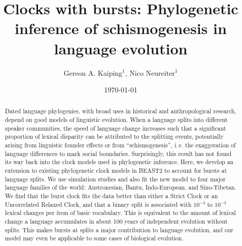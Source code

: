 \documentclass[]{rsos}%
\begin{document}
\title{Clocks with bursts: Phylogenetic inference of schismogenesis in language evolution}
\date{\today}
\author{
  Gereon A. Kaiping$^{1}$,
  Nico Neureiter$^{1}$}
\address{$^{1}$Geographic Information Science Center, Universität Zürich, CH}
\subject{Linguistics, Bioinformatics}


\begin{abstract}
Dated language phylogenies, with broad uses in historical and anthropological
research, depend on good models of linguistic evolution.
When a language splits into different speaker communities, the speed of
language change increases such that a
significant proportion of lexical disparity can be attributed
to the splitting events, potentially arising from linguistic founder effects or from
“schis\-mo\-gen\-e\-sis”, i.\,e.
the exaggeration of language differences to mark social boundaries.
Surprisingly, this result has not found its way back
into the clock models used in phylogenetic inference. Here, we develop an
extension to existing phylogenetic clock models in BEAST2 to
account for bursts at language splits. We use simulation studies and also fit
the new model to four major language families of the world: Austronesian,
Bantu, Indo-European, and Sino-Tibetan. We find that the burst clock fits the
data better than either a Strict Clock or an Uncorrelated Relaxed Clock, and that
a binary split is associated with $10^{-4}$ to $10^{-3}$ lexical changes per item of basic
vocabulary. This is equivalent to the amount of lexical change a language
accumulates in about 100 years of independent evolution without splits.
This makes bursts at splits a major contribution to language evolution,
and our model may even be applicable to some cases of biological evolution.
\end{abstract}
\end{document}
